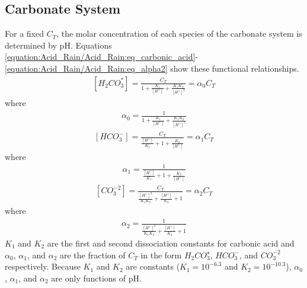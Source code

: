 \documentclass[letterpaper,10pt,english]{sphinxmanual}
\begin{document}
\subsection{Carbonate System}
\label{\detokenize{Acid_Rain/Acid_Rain:carbonate-system}}
For a fixed \(C_T\), the molar concentration of each species of the carbonate system is determined by pH. Equations \eqref{equation:Acid_Rain/Acid_Rain:eq_carbonic_acid}-\eqref{equation:Acid_Rain/Acid_Rain:eq_alpha2} show these functional relationships.
\begin{equation}\label{equation:Acid_Rain/Acid_Rain:eq_carbonic_acid}
\begin{split} \left[H_2 {CO}_3^* \right] = \frac{C_T}{1+\frac{K_1}{[H^+]} +\frac{K_1 K_2}{[H^+]^2} } = \alpha_0 C_T\end{split}
\end{equation}
where
\begin{equation}\label{equation:Acid_Rain/Acid_Rain:eq_alpha0}
\begin{split} \alpha_0 =\frac{1}{1+\frac{K_1 }{[H^+]} +\frac{K_1 K_2}{[H^+]^2} }\end{split}
\end{equation}\begin{equation}\label{equation:Acid_Rain/Acid_Rain:eq_bicarbonate}
\begin{split} \left[{HCO}_3^- \right]=\frac{C_T}{\frac{[H^+ ]}{K_1 } +1+ \frac{K_2}{[H^+]}} =\alpha_1 C_T\end{split}
\end{equation}
where
\begin{equation}\label{equation:Acid_Rain/Acid_Rain:eq_alpha1}
\begin{split} \alpha_1 = \frac{1}{\frac{[H^+]}{K_1} + 1 + \frac{K_2}{[H^+]}}\end{split}
\end{equation}\begin{equation}\label{equation:Acid_Rain/Acid_Rain:eq_carbonate}
\begin{split} \left[{CO}_3^{-2} \right] = \frac{C_T}{\frac{[H^+]^2}{K_1 K_2} +\frac{[H^+]}{K_2} +1 } =\alpha_2 C_T\end{split}
\end{equation}
where
\begin{equation}\label{equation:Acid_Rain/Acid_Rain:eq_alpha2}
\begin{split} \alpha_2 = \frac{1}{\frac{[H^+]^2 }{K_1 K_2} +\frac{[H^+]}{K_2} + 1}\end{split}
\end{equation}
\(K_1\) and \(K_2\) are the first and second dissociation constants for carbonic acid and \(\alpha_0\), \(\alpha_1\), and \(\alpha_2\) are the fraction of \(C_T\) in the form \(H_2CO_3^\star\), \(HCO_3^-\), and \(CO_3^{-2}\) respectively. Because \(K_1\) and \(K_2\) are constants (\(K_1 = 10^{-6.3}\) and \(K_2 = 10^{-10.3}\)), \(\alpha_0\), \(\alpha_1\), and \(\alpha_2\) are only functions of pH.
\end{document}
